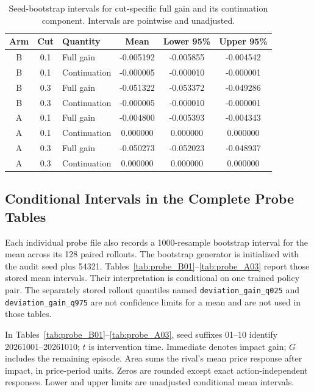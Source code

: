 \documentclass{article}
\begin{document}
\begin{table}[t]
\centering
\caption{Seed-bootstrap intervals for cut-specific full gain and its continuation component. Intervals are pointwise and unadjusted.}
\label{tab:bootstrap_ci}
\small
{}
\begin{tabular}{@{}cc l SSS@{}}
\toprule
Arm & Cut & Quantity & {Mean} & {Lower 95\%} & {Upper 95\%} \\
\midrule
B & 0.1 & Full gain      & -0.005192 & -0.005855 & -0.004542 \\
B & 0.1 & Continuation   & -0.000005 & -0.000010 & -0.000001 \\
B & 0.3 & Full gain      & -0.051322 & -0.053372 & -0.049286 \\
B & 0.3 & Continuation   & -0.000005 & -0.000010 & -0.000001 \\
A & 0.1 & Full gain      & -0.004800 & -0.005393 & -0.004343 \\
A & 0.1 & Continuation   &  0.000000 &  0.000000 &  0.000000 \\
A & 0.3 & Full gain      & -0.050273 & -0.052023 & -0.048937 \\
A & 0.3 & Continuation   &  0.000000 &  0.000000 &  0.000000 \\
\bottomrule
\end{tabular}
\end{table}

\subsection{Conditional Intervals in the Complete Probe Tables}

Each individual probe file also records a \num{1000}-resample bootstrap interval for the mean across its 128 paired rollouts. The bootstrap generator is initialized with the audit seed plus \num{54321}. Tables~\ref{tab:probe_B01}--\ref{tab:probe_A03} report those stored mean intervals. Their interpretation is conditional on one trained policy pair. The separately stored rollout quantiles named \texttt{deviation\_gain\_q025} and \texttt{deviation\_gain\_q975} are not confidence limits for a mean and are not used in those tables.

In Tables~\ref{tab:probe_B01}--\ref{tab:probe_A03}, seed suffixes 01--10 identify 20261001--20261010; $t$ is intervention time. Immediate denotes impact gain; $G$ includes the remaining episode. Area sums the rival's mean price response after impact, in price-period units. Zeros are rounded except exact action-independent responses. Lower and upper limits are unadjusted conditional mean intervals.
\end{document}
